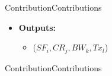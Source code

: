 \begin{frame}{Contribution}{Contributions}
\begin{itemize}
		\item \textbf{Outputs:}
		\begin{itemize}
			\item ($SF_{i}, CR_{j}, BW_{k}, Tx_{l}$)
		\end{itemize}
	\end{itemize}
\end{frame}

\begin{frame}{Contribution}{Contributions}
\end{frame}



